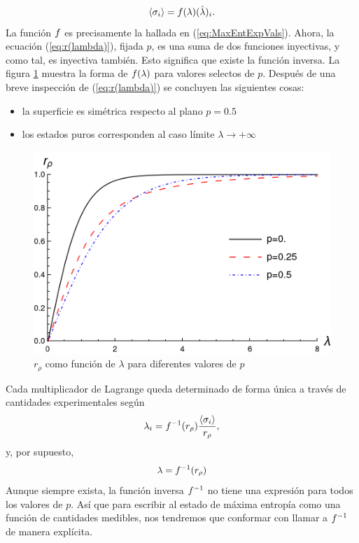 \begin{equation}
    \expval{\sigma_{i}}=f(\lambda)(\hat{\lambda})_{i}.
\end{equation}
La función $f$ es precisamente la hallada en (\ref{eq:MaxEntExpVals}). Ahora, la ecuación (\ref{eq:r(lambda)}), fijada $p$, es una suma de dos funciones inyectivas, y como tal, es inyectiva también. Esto significa que existe la función inversa. La figura \ref{fig:r(lambda)} muestra la forma de $f(\lambda)$ para valores selectos de $p$. Después de una breve inspección de (\ref{eq:r(lambda)}) se concluyen las siguientes cosas:
\begin{itemize}
\item la superficie es simétrica respecto al plano $p=0.5$
\item los estados puros corresponden al caso límite $\lambda\rightarrow+\infty$
\end{itemize}
\begin{figure}[h!]
    \centering
    \includegraphics[width=0.6\linewidth]{chapter2/figures/r(lambda).png}
    \caption{$r_{\rho}$ como función de $\lambda$ para diferentes valores de $p$}
    \label{fig:r(lambda)}
\end{figure}
Cada multiplicador de Lagrange queda determinado de forma única a través de cantidades experimentales según 
\begin{equation}
    \lambda_{i}=f^{-1}(r_{\rho}) \frac{\expval{\sigma_{i}}}{r_{\rho}},
\end{equation}
y, por supuesto,
\begin{equation*}
    \lambda=f^{-1}(r_{\rho})
\end{equation*}
Aunque siempre exista, la función inversa $f^{-1}$ no tiene una expresión  para todos los valores de $p$. Así que para escribir al estado de máxima entropía como una función de cantidades medibles, nos tendremos que conformar con llamar a $f^{-1}$ de manera explícita.

